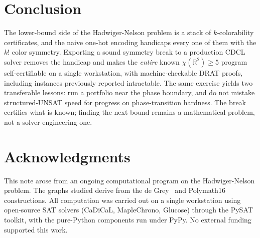 \documentclass[11pt]{article}
\theoremstyle{definition}
\newcommand{\R}{\mathbb{R}}
\newcommand{\chrom}{\chi}
\begin{document}
\section{Conclusion}
\label{sec:conclusion}

The lower-bound side of the Hadwiger-Nelson problem is a stack of
$k$-colorability certificates, and the naive one-hot encoding handicaps every one
of them with the $k!$ color symmetry. Exporting a sound symmetry break to a
production CDCL solver removes the handicap and makes the \emph{entire} known
$\chrom(\R^2) \ge 5$ program self-certifiable on a single workstation, with
machine-checkable DRAT proofs, including instances previously reported
intractable. The same exercise yields two transferable lessons: run a portfolio
near the phase boundary, and do not mistake structured-UNSAT speed for progress on
phase-transition hardness. The break certifies what is known; finding the next
bound remains a mathematical problem, not a solver-engineering one.

\section*{Acknowledgments}
This note arose from an ongoing computational program on the Hadwiger-Nelson
problem. The graphs studied derive from the de Grey~\cite{deGrey2018} and
Polymath16~\cite{Polymath16} constructions. All computation was carried out on a
single workstation using open-source SAT solvers (CaDiCaL, MapleChrono, Glucose)
through the PySAT toolkit, with the pure-Python components run under PyPy. No
external funding supported this work.



\end{document}
